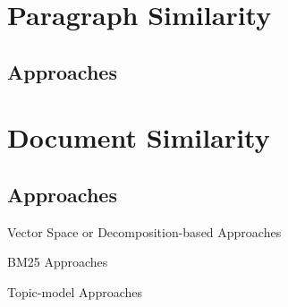 \documentclass[fullname]{clv2}
\begin{document}
\section{Paragraph Similarity}

\subsection{Approaches}

\begin{enumerate*}
\item \cite{galitsky2013parse}
\item \cite{le2014distributed}
\item \cite{higgins2014getting}
\end{enumerate*}

\section{Document Similarity}

\subsection{Approaches}


\noindent Vector Space or Decomposition-based Approaches
\begin{enumerate*}
\item \cite{salton1975vector}
\item \cite{deerwester1990indexing}
\item \cite{hofmann1999probabilistic}
\item \cite{xu2003document}
\item \cite{xu2004document}
\item \cite{cai2011locally}
\end{enumerate*}

\noindent BM25 Approaches
\begin{enumerate*}
\item \cite{robertson2004simple}
\end{enumerate*}


\noindent Topic-model Approaches
\begin{enumerate*}
\item \cite{blei2003latent}
\item \cite{blei2009visualizing}
\item \cite{teh2006hierarchical}
\item \cite{kim2012modeling}
\item \cite{griffiths2004hierarchical}
\item \cite{li2006pachinko}
\item \cite{steyvers2007probabilistic}
\item \cite{ghahramani2010tree}
\item \cite{mao2012sshlda}
\item \cite{wang2013phrase}
\item \cite{mccallum2007topic}
\item \cite{el2014scalable}
\end{enumerate*}
\end{document}
